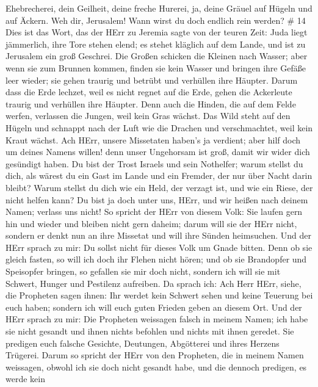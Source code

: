 Ehebrecherei, dein Geilheit, deine freche Hurerei, ja, deine Gräuel auf
Hügeln und auf Äckern. Weh dir, Jerusalem! Wann wirst du doch endlich
rein werden? \# 14  Dies ist das Wort, das der HErr zu
Jeremia sagte von der teuren Zeit:  Juda liegt jämmerlich,
ihre Tore stehen elend; es stehet kläglich auf dem Lande, und ist zu
Jerusalem ein groß Geschrei.  Die Großen schicken die
Kleinen nach Wasser; aber wenn sie zum Brunnen kommen, finden sie kein
Wasser und bringen ihre Gefäße leer wieder; sie gehen traurig und
betrübt und verhüllen ihre Häupter.  Darum dass die Erde
lechzet, weil es nicht regnet auf die Erde, gehen die Ackerleute traurig
und verhüllen ihre Häupter.  Denn auch die Hinden, die auf
dem Felde werfen, verlassen die Jungen, weil kein Gras wächst.
 Das Wild steht auf den Hügeln und schnappt nach der Luft
wie die Drachen und verschmachtet, weil kein Kraut wächst. 
Ach HErr, unsere Missetaten haben's ja verdient; aber hilf doch um
deines Namens willen! denn unser Ungehorsam ist groß, damit wir wider
dich gesündigt haben.  Du bist der Trost Israels und sein
Nothelfer; warum stellst du dich, als wärest du ein Gast im Lande und
ein Fremder, der nur über Nacht darin bleibt?  Warum stellst
du dich wie ein Held, der verzagt ist, und wie ein Riese, der nicht
helfen kann? Du bist ja doch unter uns, HErr, und wir heißen nach deinem
Namen; verlass uns nicht!  So spricht der HErr von diesem
Volk: Sie laufen gern hin und wieder und bleiben nicht gern daheim;
darum will sie der HErr nicht, sondern er denkt nun an ihre Missetat und
will ihre Sünden heimsuchen.  Und der HErr sprach zu mir:
Du sollst nicht für dieses Volk um Gnade bitten.  Denn ob
sie gleich fasten, so will ich doch ihr Flehen nicht hören; und ob sie
Brandopfer und Speisopfer bringen, so gefallen sie mir doch nicht,
sondern ich will sie mit Schwert, Hunger und Pestilenz aufreiben.
 Da sprach ich: Ach Herr HErr, siehe, die Propheten sagen
ihnen: Ihr werdet kein Schwert sehen und keine Teuerung bei euch haben;
sondern ich will euch guten Frieden geben an diesem Ort. 
Und der HErr sprach zu mir: Die Propheten weissagen falsch in meinem
Namen; ich habe sie nicht gesandt und ihnen nichts befohlen und nichts
mit ihnen geredet. Sie predigen euch falsche Gesichte, Deutungen,
Abgötterei und ihres Herzens Trügerei.  Darum so spricht
der HErr von den Propheten, die in meinem Namen weissagen, obwohl ich
sie doch nicht gesandt habe, und die dennoch predigen, es werde kein
